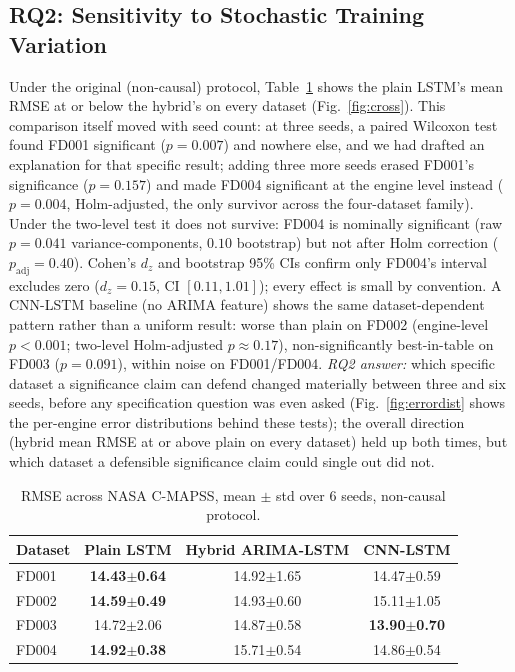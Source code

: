\documentclass[conference]{IEEEtran}
\begin{document}
\subsection{RQ2: Sensitivity to Stochastic Training Variation}
Under the original (non-causal) protocol, Table~\ref{tab:main} shows the plain LSTM's mean RMSE at or below the hybrid's on every dataset (Fig.~\ref{fig:cross}). This comparison itself moved with seed count: at three seeds, a paired Wilcoxon test found FD001 significant ($p=0.007$) and nowhere else, and we had drafted an explanation for that specific result; adding three more seeds erased FD001's significance ($p=0.157$) and made FD004 significant at the engine level instead ($p=0.004$, Holm-adjusted, the only survivor across the four-dataset family). Under the two-level test it does not survive: FD004 is nominally significant (raw $p=0.041$ variance-components, $0.10$ bootstrap) but not after Holm correction ($p_{\text{adj}}=0.40$). Cohen's $d_z$ and bootstrap 95\% CIs confirm only FD004's interval excludes zero ($d_z=0.15$, CI $[0.11,1.01]$); every effect is small by convention. A CNN-LSTM baseline (no ARIMA feature) shows the same dataset-dependent pattern rather than a uniform result: worse than plain on FD002 (engine-level $p<0.001$; two-level Holm-adjusted $p\approx0.17$), non-significantly best-in-table on FD003 ($p=0.091$), within noise on FD001/FD004. \emph{RQ2 answer:} which specific dataset a significance claim can defend changed materially between three and six seeds, before any specification question was even asked (Fig.~\ref{fig:errordist} shows the per-engine error distributions behind these tests); the overall direction (hybrid mean RMSE at or above plain on every dataset) held up both times, but which dataset a defensible significance claim could single out did not.

\begin{table}[t]
\centering
\caption{RMSE across NASA C-MAPSS, mean $\pm$ std over 6 seeds, non-causal protocol.}
\label{tab:main}
\footnotesize
\begin{tabular}{lccc}
\toprule
Dataset & Plain LSTM & Hybrid ARIMA-LSTM & CNN-LSTM \\
\midrule
FD001 & \textbf{14.43{\tiny$\pm$0.64}} & 14.92{\tiny$\pm$1.65} & 14.47{\tiny$\pm$0.59} \\
FD002 & \textbf{14.59{\tiny$\pm$0.49}} & 14.93{\tiny$\pm$0.60} & 15.11{\tiny$\pm$1.05} \\
FD003 & 14.72{\tiny$\pm$2.06} & 14.87{\tiny$\pm$0.58} & \textbf{13.90{\tiny$\pm$0.70}} \\
FD004 & \textbf{14.92{\tiny$\pm$0.38}} & 15.71{\tiny$\pm$0.54} & 14.86{\tiny$\pm$0.54} \\
\bottomrule
\end{tabular}
\end{table}
\end{document}
